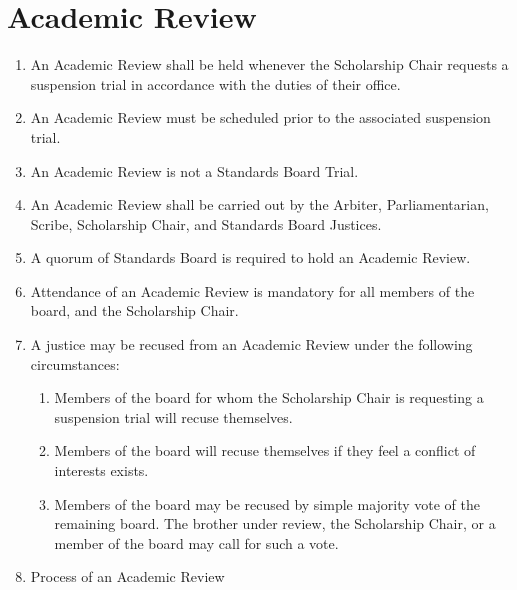 \section{Academic Review}
	\label{academic-review}
	\begin{enumerate}
		\item An Academic Review shall be held whenever the Scholarship Chair requests a suspension trial in accordance with the duties of their office. 
		\item An Academic Review must be scheduled prior to the associated suspension trial.
		\item An Academic Review is not a Standards Board Trial.
		\item An Academic Review shall be carried out by the Arbiter, Parliamentarian, Scribe, Scholarship Chair, and Standards Board Justices. 
		\item A quorum of Standards Board is required to hold an Academic Review.
		\item Attendance of an Academic Review is mandatory for all members of the board, and the Scholarship Chair.
		\item A justice may be recused from an Academic Review under the following circumstances:
			\begin{enumerate}
				\item Members of the board for whom the Scholarship Chair is requesting a suspension trial will recuse themselves.
				\item Members of the board will recuse themselves if they feel a conflict of interests exists.
				\item Members of the board may be recused by simple majority vote of the remaining board. The brother under review, the Scholarship Chair, or a member of the board may call for such a vote.
			\end{enumerate}
		\item Process of an Academic Review

\end{enumerate}

